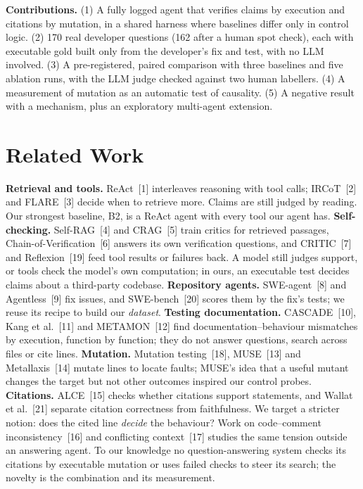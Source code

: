 \documentclass[10pt,a4paper]{article}
\begin{document}
\textbf{Contributions.} (1) A fully logged agent that verifies claims by execution and citations by mutation, in a
shared harness where baselines differ only in control logic. (2) 170 real developer questions (162 after a human spot
check), each with executable gold built only from the developer's fix and test, with no LLM involved. (3) A
pre-registered, paired comparison with three baselines and five ablation runs, with the LLM judge checked against two
human labellers. (4) A measurement of mutation as an automatic test of causality. (5) A negative result with a
mechanism, plus an exploratory multi-agent extension.

\section{Related Work}

\textbf{Retrieval and tools.} ReAct~[1] interleaves reasoning with tool calls; IRCoT~[2] and FLARE~[3] decide when to
retrieve more. Claims are still judged by reading. Our strongest baseline, B2, is a ReAct agent with every tool our
agent has. \textbf{Self-checking.} Self-RAG~[4] and CRAG~[5] train critics for retrieved passages,
Chain-of-Verification~[6] answers its own verification questions, and CRITIC~[7] and Reflexion~[19] feed tool results
or failures back. A model still judges support, or tools check the model's own computation; in ours, an executable test
decides claims about a third-party codebase. \textbf{Repository agents.} SWE-agent~[8] and Agentless~[9] fix issues,
and SWE-bench~[20] scores them by the fix's tests; we reuse its recipe to build our \emph{dataset}. \textbf{Testing
documentation.} CASCADE~[10], Kang et al.~[11] and METAMON~[12] find documentation--behaviour mismatches by execution,
function by function; they do not answer questions, search across files or cite lines. \textbf{Mutation.} Mutation
testing~[18], MUSE~[13] and Metallaxis~[14] mutate lines to locate faults; MUSE's idea that a useful mutant changes the
target but not other outcomes inspired our control probes. \textbf{Citations.} ALCE~[15] checks whether citations
support statements, and Wallat et al.~[21] separate citation correctness from faithfulness. We target a stricter notion:
does the cited line \emph{decide} the behaviour? Work on code--comment inconsistency~[16] and conflicting context~[17]
studies the same tension outside an answering agent. To our knowledge no question-answering system checks its citations
by executable mutation or uses failed checks to steer its search; the novelty is the combination and its measurement.
\end{document}
